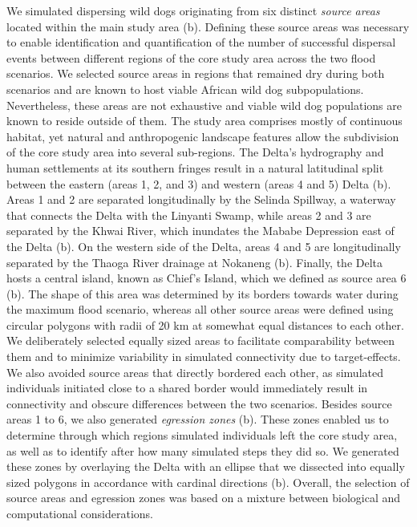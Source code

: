 \documentclass[abstract=on,10pt,a4paper,bibliography=totocnumbered]{article}
\begin{document}
We simulated dispersing wild dogs originating from six distinct \textit{source
areas} located within the main study area (b). Defining these
source areas was necessary to enable identification and quantification of the
number of successful dispersal events between different regions of the core
study area across the two flood scenarios. We selected source areas in regions
that remained dry during both scenarios and are known to host viable African
wild dog subpopulations. Nevertheless, these areas are not exhaustive and viable
wild dog populations are known to reside outside of them. The study area
comprises mostly of continuous habitat, yet natural and anthropogenic landscape
features allow the subdivision of the core study area into several sub-regions.
The Delta's hydrography and human settlements at its southern fringes result in
a natural latitudinal split between the eastern (areas 1, 2, and 3) and western
(areas 4 and 5) Delta (b). Areas 1 and 2 are separated
longitudinally by the Selinda Spillway, a waterway that connects the Delta with
the Linyanti Swamp, while areas 2 and 3 are separated by the Khwai River, which
inundates the Mababe Depression east of the Delta (b). On the
western side of the Delta, areas 4 and 5 are longitudinally separated by the
Thaoga River drainage at Nokaneng (b). Finally, the Delta hosts
a central island, known as Chief's Island, which we defined as source area 6
(b). The shape of this area was determined by its borders
towards water during the maximum flood scenario, whereas all other source areas
were defined using circular polygons with radii of 20 km at somewhat equal
distances to each other. We deliberately selected equally sized areas to
facilitate comparability between them and to minimize variability in simulated
connectivity due to target-effects. We also avoided source areas that directly
bordered each other, as simulated individuals initiated close to a shared border
would immediately result in connectivity and obscure differences between the two
scenarios. Besides source areas 1 to 6, we also generated \textit{egression
zones} (b). These zones enabled us to determine through which
regions simulated individuals left the core study area, as well as to identify
after how many simulated steps they did so. We generated these zones by
overlaying the Delta with an ellipse that we dissected into equally sized
polygons in accordance with cardinal directions (b). Overall,
the selection of source areas and egression zones was based on a mixture between
biological and computational considerations.
\end{document}
